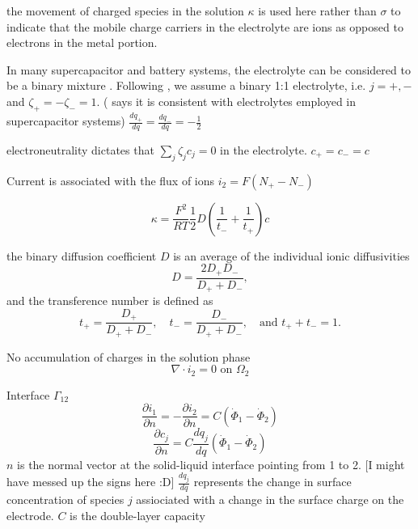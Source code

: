 \documentclass[10pt, oneside]{article}   	%
\begin{document}
the movement of charged species in the solution
$\kappa$ is used here rather than $\sigma$ to indicate that the mobile charge
carriers in the electrolyte are ions as opposed to electrons in the metal
portion.

In many supercapacitor and battery systems, the electrolyte can be considered
to be a binary mixture \cite{Newman2004}.  Following \cite{Verbrugge2005}, we
assume a binary 1:1 electrolyte, i.e. $j=+,-$ and $\zeta_+=-\zeta_-=1$.
(\cite{Verbrugge2005} says it is consistent with electrolytes employed in
supercapacitor systems)
$\frac{d q_+}{d q}=\frac{d q_-}{d q}=-\frac{1}{2}$

electroneutrality dictates that $\sum_j \zeta_j c_j = 0$ in the electrolyte.
$c_+=c_-=c$

Current is associated with the flux of ions $i_2 = F(N_+ - N_-)$

\begin{equation}
    \kappa = \frac{F^2}{RT} \frac{1}{2} D \left(
        \frac{1}{t_-} + \frac{1}{t_+}
        \right) c
\end{equation}

the binary diffusion coefficient $D$ is an average of the individual ionic
diffusivities 
\begin{equation}
    D = \frac{2 D_+ D_-}{D_+ + D_-} ,
\end{equation}
and the transference number is defined as
\begin{equation}
    t_+ = \frac{D_+}{D_+ + D_-}
    , \quad
    t_- = \frac{D_-}{D_+ + D_-}
    , \quad \text{and }
    t_+ + t_- = 1 .
\end{equation}


No accumulation of charges in the solution phase
\begin{equation}
    \nabla \cdot i_2 = 0 \text{ on } \Omega_2
\end{equation}

Interface $\Gamma_{12}$
\begin{equation}
    \frac{\partial i_1}{\partial n} = 
    -\frac{\partial i_2}{\partial n} = 
        C \left( \dot{\Phi}_1 - \dot{\Phi}_2 \right)
\end{equation}
\begin{equation}
    \frac{\partial c_j}{\partial n} = 
        C \frac{d q_j}{d q} \left( \dot{\Phi}_1 - \dot{\Phi}_2 \right)
\end{equation}
$n$ is the normal vector at the solid-liquid interface pointing from 1 to 2.
[I might have messed up the signs here :D]
$\frac{d q_j}{d q}$ represents the change in surface concentration of species
$j$ assiociated with a change in the surface charge on the electrode.
$C$ is the double-layer capacity
\end{document}
